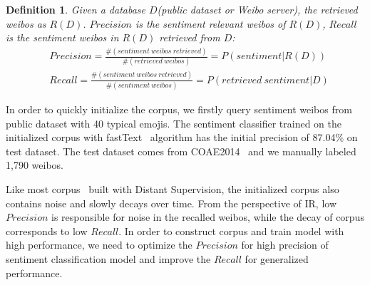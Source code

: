 \documentclass[runningheads]{llncs}
\begin{document}
\newtheorem{myDef}{Definition}

\begin{myDef}
Given a database $D$(public dataset or Weibo server), the retrieved weibos as $R(D)$.  $Precision$ is the sentiment relevant weibos of $R(D)$, $Recall$ is the sentiment weibos in $R(D)$ retrieved from $D$:
\scriptsize{ %
\begin{align}
&Precision = \frac{\#\left ( sentiment\ weibos\ retrieved \right )}{\#\left ( retrieved\ weibos \right )} = P\left ( sentiment | R(D) \right ) \\
&Recall = \frac{\#\left ( sentiment\ weibos\ retrieved \right )}{\#\left ( sentiment\ weibos \right )} = P\left (retrieved\ sentiment | D\right )
\end{align}
} %
\end{myDef}

In order to quickly initialize the corpus, we firstly query sentiment weibos from public dataset with 40 typical emojis. The sentiment classifier trained on the initialized corpus with fastText~\cite{joulin2016bag} algorithm has the initial precision of 87.04\% on test dataset. The test dataset comes from COAE2014~\cite{Yang2015Task} and we manually labeled 1,790 weibos.

Like most corpus~\cite{go2009twitter,pak2010twitter,iosifidis2017large} built with Distant Supervision, the initialized corpus also contains noise and slowly decays over time. From the perspective of IR, low $Precision$ is responsible for noise in the recalled weibos, while the decay of corpus corresponds to low $Recall$. In order to construct corpus and train model with high performance, we need to optimize the $Precision$ for high precision of sentiment classification model and improve the $Recall$ for generalized performance.

\end{document}
